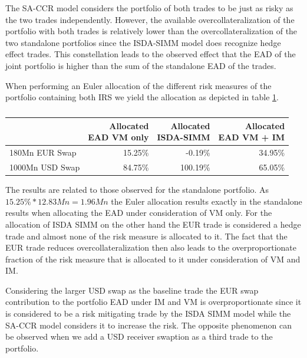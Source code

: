 \documentclass[../Thesis_AHoecherl.tex]{subfiles}
\begin{document}
    The SA-CCR model considers the portfolio of both trades to be just as risky as the two trades independently. However, the available overcollateralization of the portfolio with both trades is relatively lower than the overcollateralization of the two standalone portfolios since the ISDA-SIMM model does recognize hedge effect trades. This constellation leads to the observed effect that the EAD of the joint portfolio is higher than the sum of the standalone EAD of the trades.

    When performing an Euler allocation of the different risk measures of the portfolio containing both IRS we yield the allocation as depicted in table \ref{tab:2TradeRatesAllocation}.

    \begin{table}[htbp]
        \centering
        \begin{tabular}{l||r|r|r}
                & \makecell{Allocated \\ EAD VM only} & \makecell{Allocated \\ ISDA-SIMM} & \makecell{Allocated \\ EAD VM + IM} \\
                \toprule
        180Mn EUR Swap & 15.25\% & -0.19\% & 34.95\% \\
        1000Mn USD Swap & 84.75\% & 100.19\% & 65.05\% \\
        \end{tabular}%
        \caption{}
        \label{tab:2TradeRatesAllocation}%
    \end{table}%
    
    The results are related to those observed for the standalone portfolio. As $15.25\% * 12.83Mn = 1.96Mn$ the Euler allocation results exactly in the standalone results when allocating the EAD under consideration of VM only. 
    For the allocation of ISDA SIMM on the other hand the EUR trade is considered a hedge trade and almost none of the risk measure is allocated to it. 
    The fact that the EUR trade reduces overcollateralization then also leads to the overproportionate fraction of the risk measure that is allocated to it under consideration of VM and IM.
    
    Considering the larger USD swap as the baseline trade the EUR swap contribution to the portfolio EAD under IM and VM is overproportionate since it is considered to be a risk mitigating trade by the ISDA SIMM model while the SA-CCR model considers it to increase the risk. The opposite phenomenon can be observed when we add a USD receiver swaption as a third trade to the portfolio.
\end{document}
